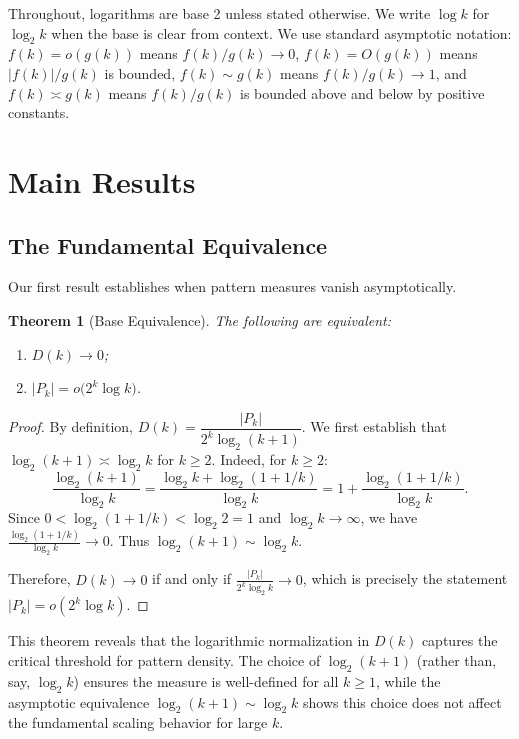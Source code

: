 \documentclass[11pt]{article}
\newtheorem{theorem}{Theorem}
\theoremstyle{definition}
\begin{document}
Throughout, logarithms are base 2 unless stated otherwise. We write $\log k$ for $\log_2 k$ when the base is clear from context. We use standard asymptotic notation: $f(k)=o(g(k))$ means $f(k)/g(k)\to 0$, $f(k)=O(g(k))$ means $|f(k)|/g(k)$ is bounded, $f(k)\sim g(k)$ means $f(k)/g(k) \to 1$, and $f(k)\asymp g(k)$ means $f(k)/g(k)$ is bounded above and below by positive constants.

\section{Main Results}

\subsection{The Fundamental Equivalence}

Our first result establishes when pattern measures vanish asymptotically.

\begin{theorem}[Base Equivalence]\label{thm:base-equivalence}
The following are equivalent:
\begin{enumerate}
\item[(i)] $D(k)\to 0$;
\item[(ii)] $|P_k|=o\big(2^k\log k\big)$.
\end{enumerate}
\end{theorem}

\begin{proof}
By definition, $D(k)=\dfrac{|P_k|}{2^k\log_2(k+1)}$. We first establish that $\log_2(k+1)\asymp\log_2 k$ for $k\geq 2$. Indeed, for $k\geq 2$:
$$\frac{\log_2(k+1)}{\log_2 k} = \frac{\log_2 k + \log_2(1 + 1/k)}{\log_2 k} = 1 + \frac{\log_2(1 + 1/k)}{\log_2 k}.$$
Since $0 < \log_2(1 + 1/k) < \log_2 2 = 1$ and $\log_2 k \to \infty$, we have $\frac{\log_2(1 + 1/k)}{\log_2 k} \to 0$. Thus $\log_2(k+1) \sim \log_2 k$.

Therefore, $D(k)\to 0$ if and only if $\frac{|P_k|}{2^k\log_2 k}\to 0$, which is precisely the statement $|P_k|=o(2^k\log k)$.
\end{proof}

This theorem reveals that the logarithmic normalization in $D(k)$ captures the critical threshold for pattern density. The choice of $\log_2(k+1)$ (rather than, say, $\log_2 k$) ensures the measure is well-defined for all $k \geq 1$, while the asymptotic equivalence $\log_2(k+1) \sim \log_2 k$ shows this choice does not affect the fundamental scaling behavior for large $k$.
\end{document}
